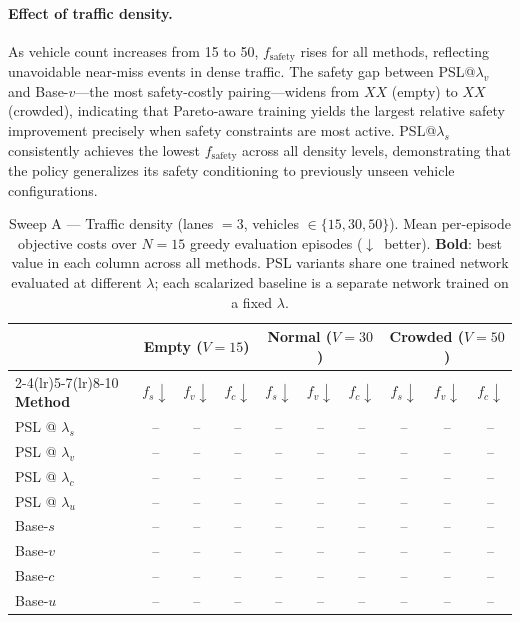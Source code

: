 \documentclass[conference]{IEEEtran}
\begin{document}
\paragraph{Effect of traffic density.}
As vehicle count increases from 15 to 50, $f_{\text{safety}}$ rises for
all methods, reflecting unavoidable near-miss events in dense traffic.
The safety gap between PSL@$\lambda_v$ and Base-$v$---the most
safety-costly pairing---widens from $XX$ (empty) to $XX$ (crowded),
indicating that Pareto-aware training yields the largest relative safety
improvement precisely when safety constraints are most active.
PSL@$\lambda_s$ consistently achieves the lowest $f_{\text{safety}}$ across
all density levels, demonstrating that the policy generalizes its safety
conditioning to previously unseen vehicle configurations.


\begin{table}[t]
\centering
\caption{%
  Sweep A --- Traffic density (lanes $= 3$, vehicles $\in \{15, 30, 50\}$).
  Mean per-episode objective costs over $N\!=\!15$ greedy evaluation episodes
  ($\downarrow$~better).
  \textbf{Bold}: best value in each column across all methods.
  PSL variants share one trained network evaluated at different $\lambda$;
  each scalarized baseline is a separate network trained on a fixed $\lambda$.
}
\label{tab:sweep_a}
\footnotesize
\setlength{\tabcolsep}{4.5pt}
\begin{tabular}{l | ccc | ccc | ccc}
\toprule
 & \multicolumn{3}{c|}{\textbf{Empty} ($V = 15$)}
 & \multicolumn{3}{c|}{\textbf{Normal} ($V = 30$)}
 & \multicolumn{3}{c}{\textbf{Crowded} ($V = 50$)} \\
\cmidrule(lr){2-4}\cmidrule(lr){5-7}\cmidrule(lr){8-10}
\textbf{Method}
  & $f_s \downarrow$ & $f_v \downarrow$ & $f_c \downarrow$
  & $f_s \downarrow$ & $f_v \downarrow$ & $f_c \downarrow$
  & $f_s \downarrow$ & $f_v \downarrow$ & $f_c \downarrow$ \\
\midrule
PSL @ $\lambda_s$ & -- & -- & -- & -- & -- & -- & -- & -- & -- \\
PSL @ $\lambda_v$ & -- & -- & -- & -- & -- & -- & -- & -- & -- \\
PSL @ $\lambda_c$ & -- & -- & -- & -- & -- & -- & -- & -- & -- \\
PSL @ $\lambda_u$ & -- & -- & -- & -- & -- & -- & -- & -- & -- \\
\midrule
Base-$s$          & -- & -- & -- & -- & -- & -- & -- & -- & -- \\
Base-$v$          & -- & -- & -- & -- & -- & -- & -- & -- & -- \\
Base-$c$          & -- & -- & -- & -- & -- & -- & -- & -- & -- \\
Base-$u$          & -- & -- & -- & -- & -- & -- & -- & -- & -- \\
\bottomrule
\end{tabular}
\end{table}
\end{document}
